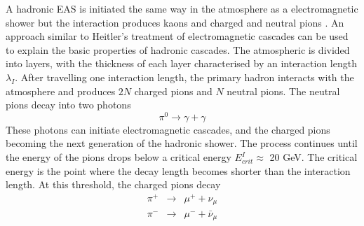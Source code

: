 A hadronic EAS is initiated the same way in the atmosphere as a electromagnetic shower but the interaction produces kaons and charged and neutral pions \cite{kumpel}. An approach similar to Heitler's treatment of electromagnetic cascades can be used to explain the basic properties of hadronic cascades. The atmospheric is divided into layers, with the thickness of each layer characterised by an interaction length $\lambda_I$. After travelling one interaction length, the primary hadron interacts with the atmosphere and produces $2N$ charged pions and $N$ neutral pions. The neutral pions decay into two photons
\begin{equation}
\pi^0 \rightarrow \gamma + \gamma
\end{equation}
These photons can initiate electromagnetic cascades, and the charged pions becoming the next generation of the hadronic shower. The process continues until the energy of the pions drops below a critical energy $E^I_{crit} \approx$ 20 GeV. The critical energy is the point where the decay length becomes shorter than the interaction length. At this threshold, the charged pions decay
\begin{eqnarray}
\pi^+ & \rightarrow & \mu^+ + \nu_{\mu} \\
\pi^- & \rightarrow & \mu^- + \bar{\nu}_{\mu}
\end{eqnarray}
